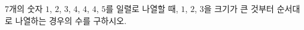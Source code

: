 7개의 숫자 $1$, $2$, $3$, $4$, $4$, $4$, $5$를 일렬로 나열할 때, $1$, $2$, $3$을 크기가 큰 것부터 순서대로 나열하는 경우의 수를 구하시오.
